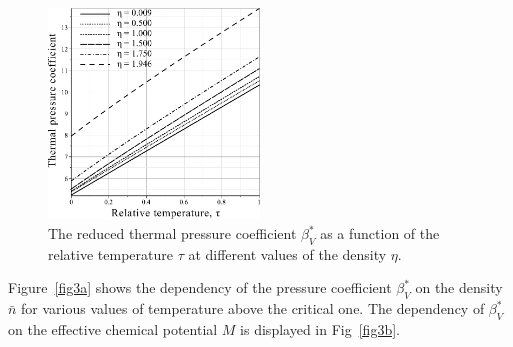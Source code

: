 \begin{figure}[h!]
	\centering \includegraphics[width=0.5\textwidth]{f3c.pdf}
	\vskip-3mm\caption{The reduced thermal pressure coefficient $\beta^*_V$ as a function of the relative temperature $\tau$ at different values of the density $\eta$. 
	}\label{fig3c}
\end{figure}

Figure~\ref{fig3a} shows the dependency of the pressure coefficient $\beta^*_V$ on the density $\bar{n}$ for various values of temperature above the critical one. The dependency of $\beta^*_V$ on the effective chemical potential $M$ is displayed in Fig~\ref{fig3b}.

